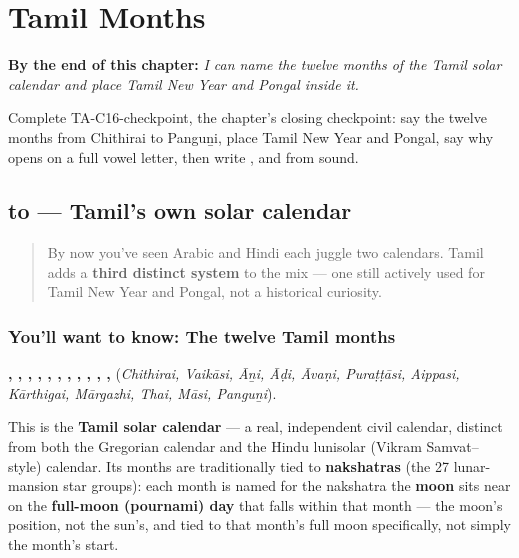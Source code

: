 
\chapter{Tamil Months}
\label{ch:ta-tamil-months}

\begin{chapteropening}
\textbf{By the end of this chapter:} \emph{I can name the twelve months of the Tamil solar calendar and place Tamil New Year and Pongal inside it.}

Complete TA-C16-checkpoint, the chapter's closing checkpoint: say the twelve months from Chithirai to Panguṉi, place Tamil New Year and Pongal, say why  opens on a full vowel letter, then write ,  and  from sound.
\end{chapteropening}

\section[\texorpdfstring{\ta{சித்திரை} \ta{வைகாசி} … (Chithirai …)}{சித்திரை வைகாசி … (Chithirai …)}]{ to  — Tamil's own solar calendar}

\label{lesson:TA-C16-thamizh-maadangal}



\begin{quote}
By now you've seen Arabic and Hindi each juggle two calendars. Tamil adds a \textbf{third distinct system} to the mix — one still actively used for Tamil New Year and Pongal, not a historical curiosity.
\end{quote}

\subsection*{You'll want to know: The twelve Tamil months}
\textbf{, , , , , , , , , , , } (\emph{Chithirai, Vaikāsi, Āṉi, Āḍi, Āvaṇi, Puraṭṭāsi, Aippasi, Kārthigai, Mārgazhi, Thai, Māsi, Panguṉi}).

This is the \textbf{Tamil solar calendar} — a real, independent civil calendar, distinct from both the Gregorian calendar and the Hindu lunisolar (Vikram Samvat–style) calendar. Its months are traditionally tied to \textbf{nakshatras} (the 27 lunar-mansion star groups): each month is named for the nakshatra the \textbf{moon} sits near on the \textbf{full-moon (pournami) day} that falls within that month — the moon's position, not the sun's, and tied to that month's full moon specifically, not simply the month's start.

